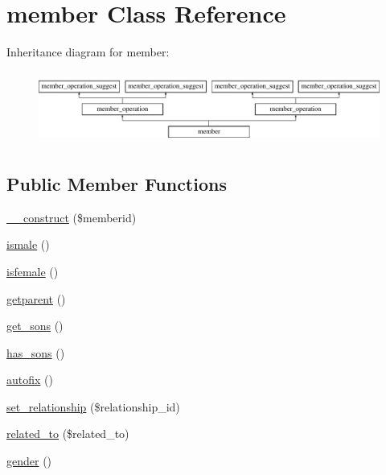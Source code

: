 \hypertarget{classmember}{\section{member Class Reference}
\label{classmember}
}
Inheritance diagram for member\-:\begin{figure}[H]
\begin{center}
\leavevmode
\includegraphics[height=2.413793cm]{classmember}
\end{center}
\end{figure}
\subsection*{Public Member Functions}
\begin{DoxyCompactItemize}
\item 
\hyperlink{classmember_aa2427c65795ffbdc72d64e2e91640463}{\-\_\-\-\_\-construct} (\$memberid)
\item 
\hyperlink{classmember_a364bea0f1ea59b67e68293ae5da9f413}{ismale} ()
\item 
\hyperlink{classmember_af93337d3c08cad93fa43b5f30c0215b0}{isfemale} ()
\item 
\hyperlink{classmember_ac331cc43c8c076314d05ac004d20e021}{getparent} ()
\item 
\hyperlink{classmember_af0d9a69479f2b9c859acb90e97bad85c}{get\-\_\-sons} ()
\item 
\hyperlink{classmember_a024f7356f2279490775b6ae432d51010}{has\-\_\-sons} ()
\item 
\hyperlink{classmember_a45c3ed97d49c45ce716892b4b5e44bd2}{autofix} ()
\item 
\hyperlink{classmember_ae0f93137fb23a9f5ae9e6a287f6232dd}{set\-\_\-relationship} (\$relationship\-\_\-id)
\item 
\hyperlink{classmember_a541afd2c1c096f5810c0b889e33287ba}{related\-\_\-to} (\$related\-\_\-to)
\item 
\hyperlink{classmember_aeb52158abb66bf82955ab17670b11eec}{gender} ()
\end{DoxyCompactItemize}
